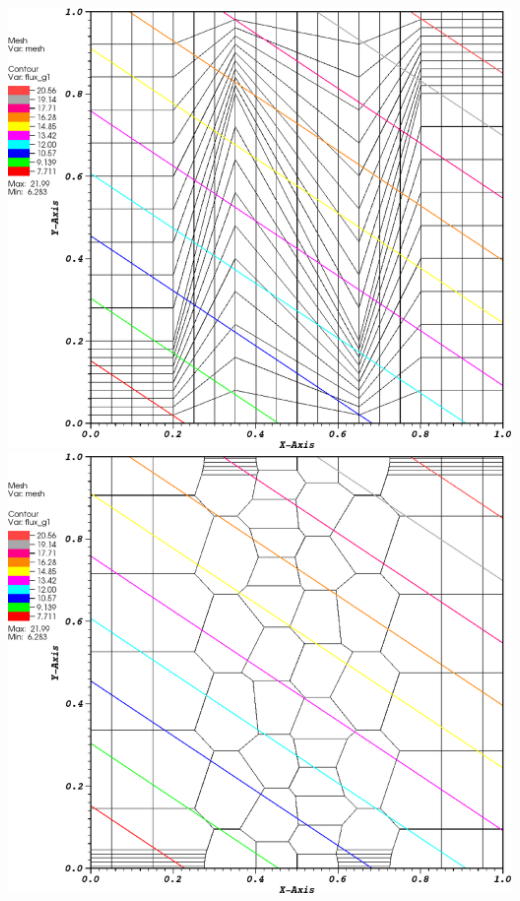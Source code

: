 \documentclass[compress,10pt]{beamer}
\begin{document}
\begin{frame}[t]
{\begin{columns}
{}\includegraphics[width=0.95\columnwidth]{images/z_quad_MAXENT_k1.eps} \\
\vspace{3mm}
{}\includegraphics[width=0.95\columnwidth]{images/z_poly_MAXENT_k1.eps} 
\end{columns}
}
\end{frame}
\end{document}
